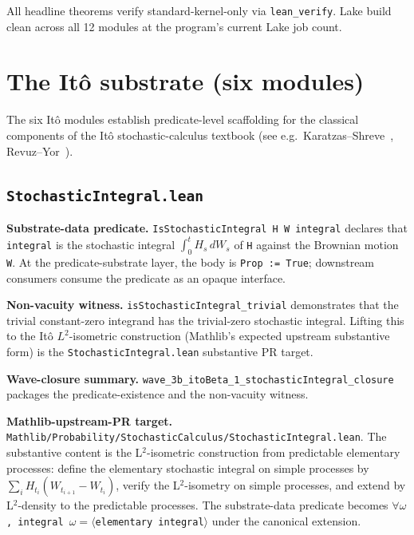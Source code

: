 \documentclass[11pt]{article}
\begin{document}
All headline theorems verify standard-kernel-only via
\texttt{lean\_verify}. Lake build clean across all 12 modules at
the program's current Lake job count.


\section{The It\^o substrate (six modules)}
\label{sec:ito}

The six It\^o modules establish predicate-level scaffolding for the
classical components of the It\^o stochastic-calculus textbook
(see e.g.\ Karatzas--Shreve~\cite{KaratzasShreve1991BMSC}, Revuz--Yor~\cite{RevuzYor1999CMSM}).

\subsection{\texttt{StochasticIntegral.lean}}

\textbf{Substrate-data predicate.}
\texttt{IsStochasticIntegral H W integral} declares that \texttt{integral}
is the stochastic integral $\int_0^t H_s\,dW_s$ of \texttt{H} against
the Brownian motion \texttt{W}. At the predicate-substrate layer,
the body is \texttt{Prop := True}; downstream consumers consume the
predicate as an opaque interface.

\textbf{Non-vacuity witness.}
\texttt{isStochasticIntegral\_trivial} demonstrates that the trivial
constant-zero integrand has the trivial-zero stochastic integral.
Lifting this to the It\^o $L^2$-isometric construction (Mathlib's
expected upstream substantive form) is the
\texttt{StochasticIntegral.lean} substantive PR target.

\textbf{Wave-closure summary.}
\texttt{wave\_3b\_itoBeta\_1\_stochasticIntegral\_closure} packages
the predicate-existence and the non-vacuity witness.

\textbf{Mathlib-upstream-PR target.}
\texttt{Mathlib/Probability/StochasticCalculus/StochasticIntegral.lean}.
The substantive content is the L${}^2$-isometric construction from
predictable elementary processes: define the elementary stochastic
integral on simple processes by $\sum_i H_{t_i} (W_{t_{i+1}} - W_{t_i})$,
verify the L${}^2$-isometry on simple processes, and extend
by L${}^2$-density to the predictable processes. The substrate-data
predicate becomes
\texttt{$\forall \omega$, integral $\omega = \langle$elementary integral$\rangle$}
under the canonical extension.
\end{document}
